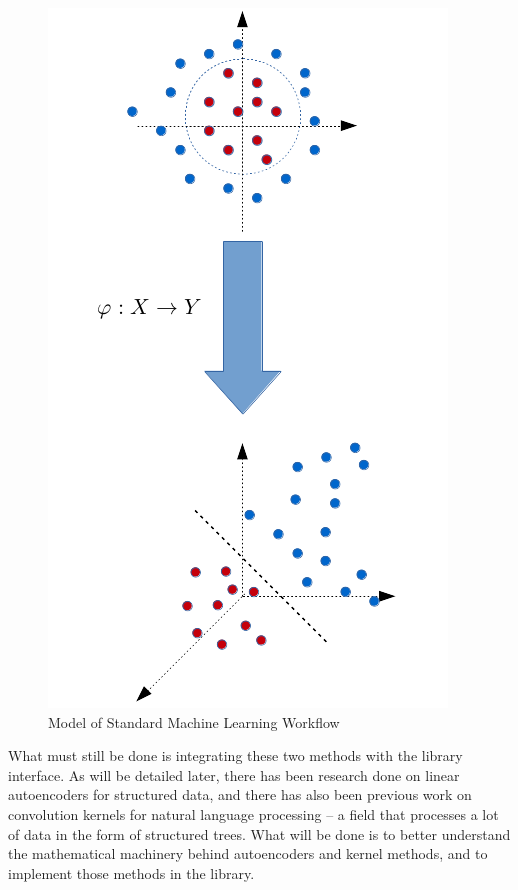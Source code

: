 \documentclass{sig-alternate}
\begin{document}
\begin{figure}[H]
	\begin{center}
		\includegraphics[width=0.75\linewidth]{kernelmeth}
	\end{center}
	\vspace{-12pt}
	\caption{Model of Standard Machine Learning Workflow}
	\label{fig:kernelmeth}
\end{figure}

What must still be done is integrating these two methods with the library interface.
As will be detailed later, there has been research done on linear autoencoders
for structured data, and there has also been previous work on convolution 
kernels for natural language processing -- a field that processes a lot of 
data in the form of structured trees. What will be done is to better understand
the mathematical machinery behind autoencoders and kernel methods, and to
implement those methods in the library.
\end{document}
